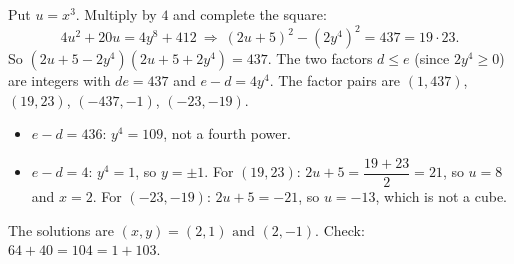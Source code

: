 Put $u=x^3$. Multiply by $4$ and complete the square:
\[
4u^2+20u=4y^8+412\ \Longrightarrow\ (2u+5)^2-(2y^4)^2=437=19\cdot23 .
\]
So $(2u+5-2y^4)(2u+5+2y^4)=437$. The two factors $d\le e$ (since $2y^4\ge0$) are integers with $de=437$ and $e-d=4y^4$. The factor pairs are $(1,437)$, $(19,23)$, $(-437,-1)$, $(-23,-19)$.
\begin{itemize}
\item $e-d=436$: $y^4=109$, not a fourth power.
\item $e-d=4$: $y^4=1$, so $y=\pm1$. For $(19,23)$: $2u+5=\dfrac{19+23}{2}=21$, so $u=8$ and $x=2$. For $(-23,-19)$: $2u+5=-21$, so $u=-13$, which is not a cube.
\end{itemize}
The solutions are $\boxed{(x,y)=(2,1)\text{ and }(2,-1)}$. Check: $64+40=104=1+103$.
